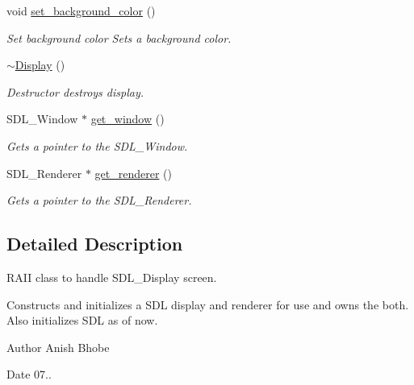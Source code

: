 \begin{DoxyCompactItemize}
\mbox{\label{classinferno_1_1graphics_1_1_display_ae0f95f33a88ffb1d93d49c079ae5db50}} 
void \mbox{\hyperlink{classinferno_1_1graphics_1_1_display_ae0f95f33a88ffb1d93d49c079ae5db50}{set\+\_\+background\+\_\+color}} ()
\begin{DoxyCompactList}\small\item\em Set background color Sets a background color. \end{DoxyCompactList}\item 
\mbox{\label{classinferno_1_1graphics_1_1_display_a4dacb6972222af9e140aa3c71ce05190}} 
\mbox{\hyperlink{classinferno_1_1graphics_1_1_display_a4dacb6972222af9e140aa3c71ce05190}{$\sim$\+Display}} ()
\begin{DoxyCompactList}\small\item\em Destructor destroys display. \end{DoxyCompactList}\item 
S\+D\+L\+\_\+\+Window $\ast$ \mbox{\hyperlink{classinferno_1_1graphics_1_1_display_aadba4fc2483f0d4b5a2ab24983c0a288}{get\+\_\+window}} ()
\begin{DoxyCompactList}\small\item\em Gets a pointer to the S\+D\+L\+\_\+\+Window. \end{DoxyCompactList}\item 
S\+D\+L\+\_\+\+Renderer $\ast$ \mbox{\hyperlink{classinferno_1_1graphics_1_1_display_a59e0f807f1012e45d4558ff6d72f0542}{get\+\_\+renderer}} ()
\begin{DoxyCompactList}\small\item\em Gets a pointer to the S\+D\+L\+\_\+\+Renderer. \end{DoxyCompactList}\end{DoxyCompactItemize}


\subsection{Detailed Description}
R\+A\+II class to handle S\+D\+L\+\_\+\+Display screen. 

Constructs and initializes a S\+DL display and renderer for use and owns the both. Also initializes S\+DL as of now. \begin{DoxyAuthor}{Author}
Anish Bhobe 
\end{DoxyAuthor}
\begin{DoxyDate}{Date}
07.. 
\end{DoxyDate}


